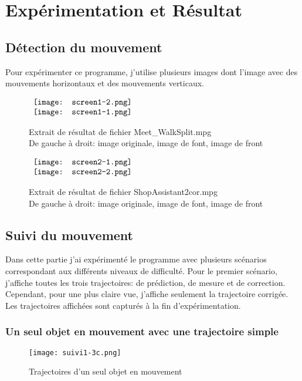 \documentclass[french,12pt,a4paper,oneside,notitlepage]{report}
\begin{document}
\section{Expérimentation et Résultat}
\subsection{Détection du mouvement}
Pour expérimenter ce programme, j'utilise plusieurs images dont l'image avec des 
mouvements horizontaux et des mouvements verticaux. 
\begin{figure}[ht]
	\begin{center}$
		\begin{array}[h]{c}
		  \texttt{[image: screen1-2.png]}\\
		  \texttt{[image: screen1-1.png]}
		\end{array}$
	\end{center}
	\caption{Extrait de résultat de fichier Meet\_WalkSplit.mpg\\
	\hspace*{1.7cm} De gauche à droit: image originale, image de font, image de front}
\end{figure}
\begin{figure}[ht]
	\begin{center}$
		\begin{array}[h]{c}
		  \texttt{[image: screen2-1.png]}\\
		  \texttt{[image: screen2-2.png]}
		\end{array}$
	\end{center}
	\caption{Extrait de résultat de fichier ShopAssistant2cor.mpg \\
	\hspace*{1.7cm} De gauche à droit: image originale, image de font, image de front}
\end{figure}

\clearpage
\subsection{Suivi du mouvement}
Dans cette partie j'ai expérimenté le programme avec plusieurs scénarios correspondant 
aux différents niveaux de difficulté. Pour le premier scénario, j'affiche toutes les 
trois trajectoires: de prédiction, de mesure et de correction. Cependant, pour une plus 
claire vue, j'affiche seulement la trajectoire corrigée. Les trajectoires affichées sont 
capturés à la fin d'expérimentation.
\subsubsection{Un seul objet en mouvement avec une trajectoire simple}
\begin{figure}[ht]
	\begin{center}
		\texttt{[image: suivi1-3c.png]}
	\end{center}
	\caption{Trajectoires d'un seul objet en mouvement}
\end{figure}
\end{document}
